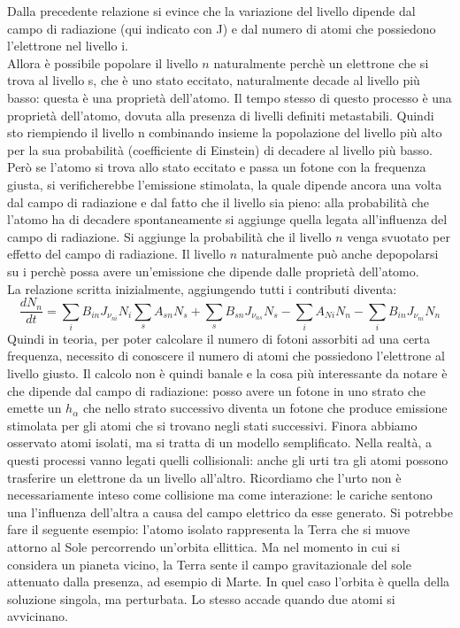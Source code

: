 \documentclass[a4paper,11pt]{article}
\begin{document}
   Dalla precedente relazione si evince che la variazione del livello dipende dal campo di radiazione (qui indicato con J) e dal numero di atomi che possiedono l'elettrone nel livello i. \\ Allora è possibile popolare il livello $n$ naturalmente perchè un elettrone che si trova al livello s, che è uno stato eccitato, naturalmente decade al livello più basso: questa è una proprietà dell'atomo. Il tempo stesso di questo processo è una proprietà dell'atomo, dovuta alla presenza di livelli definiti metastabili. Quindi sto riempiendo il livello n combinando insieme la popolazione del livello più alto per la sua probabilità (coefficiente di Einstein) di decadere al livello più basso.\\ Però se l'atomo si trova allo stato eccitato e passa un fotone con la frequenza giusta, si verificherebbe l'emissione stimolata, la quale dipende ancora una volta dal campo di radiazione e dal fatto che il livello sia pieno: alla probabilità che l'atomo ha di decadere spontaneamente si aggiunge quella legata all'influenza del campo di radiazione. Si aggiunge la probabilità che il livello $n$ venga svuotato per effetto del campo di radiazione. Il  livello $ n $ naturalmente può anche depopolarsi su i perchè possa avere un'emissione che dipende dalle proprietà dell'atomo. \\La relazione scritta inizialmente, aggiungendo tutti i contributi diventa:
   $$
    \frac{dN_n}{dt} =  \sum_{i}B_{in}J_{{\nu}_{ni}}N_i\sum_{s}A_{sn}N_s+ \sum_{s}B_{sn}J_{{\nu}_{ns}}N_s- \sum_{i}A_{Ni}N_n-\sum_{i}B_{in}J_{{\nu}_{ni}}N_n
    $$
    Quindi in teoria, per poter calcolare il numero di fotoni assorbiti ad una certa frequenza, necessito di conoscere il numero di atomi che possiedono l'elettrone al livello giusto. Il calcolo non è quindi banale e la cosa più interessante da notare è che dipende dal campo di radiazione: posso avere un fotone in uno strato che emette un $h_{\alpha}$ che nello strato successivo diventa un fotone che produce emissione stimolata per gli atomi che si trovano negli stati successivi.
    Finora abbiamo osservato atomi isolati, ma si tratta di un modello semplificato. Nella realtà, a questi processi vanno legati quelli collisionali: anche gli urti tra gli atomi possono trasferire un elettrone da un livello all'altro. Ricordiamo che l'urto non è necessariamente inteso come collisione ma come interazione: le cariche sentono una l'influenza dell'altra a causa del campo elettrico da esse generato. Si potrebbe fare il seguente esempio: l'atomo isolato rappresenta la Terra che si muove attorno al Sole percorrendo un'orbita ellittica. Ma nel momento in cui si considera un pianeta vicino, la Terra sente il campo gravitazionale del sole attenuato dalla presenza, ad esempio di Marte. In quel caso l'orbita è quella della soluzione singola, ma perturbata. Lo stesso accade quando due atomi si avvicinano.
\end{document}

